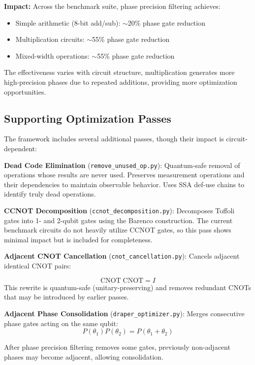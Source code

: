 \documentclass[a4paper,twocolumn]{article}
\begin{document}
\textbf{Impact:} Across the benchmark suite, phase precision filtering achieves:
\begin{itemize}
  \item Simple arithmetic (8-bit add/sub): $\sim$20\% phase gate reduction
  \item Multiplication circuits: $\sim$55\% phase gate reduction
  \item Mixed-width operations: $\sim$55\% phase gate reduction
\end{itemize}

The effectiveness varies with circuit structure, multiplication generates more high-precision phases due to
repeated additions, providing more optimization opportunities.

\subsection{Supporting Optimization Passes}

The framework includes several additional passes, though their impact is circuit-dependent:

\textbf{Dead Code Elimination} (\texttt{remove\_unused\_op.py}): Quantum-safe removal of operations whose
results are never used. Preserves measurement operations and their dependencies to maintain observable behavior.
Uses SSA def-use chains to identify truly dead operations.

\textbf{CCNOT Decomposition} (\texttt{ccnot\_decomposition.py}): Decomposes Toffoli gates into 1- and 2-qubit
gates using the Barenco construction. The current benchmark circuits do not heavily utilize CCNOT gates,
so this pass shows minimal impact but is included for completeness.

\textbf{Adjacent CNOT Cancellation} (\texttt{cnot\_cancellation.py}): Cancels adjacent identical CNOT pairs:

\begin{equation}
  \mathrm{CNOT}\;\mathrm{CNOT} = I
\end{equation}
This rewrite is quantum-safe (unitary-preserving) and removes redundant CNOTs that may be introduced by earlier passes.

\textbf{Adjacent Phase Consolidation} (\texttt{draper\_optimizer.py}): Merges consecutive phase gates acting on the same qubit:
\begin{equation}
  P(\theta_1) P(\theta_2) = P(\theta_1 + \theta_2)
\end{equation}

After phase precision filtering removes some gates, previously non-adjacent phases may become adjacent, allowing consolidation.
\end{document}
